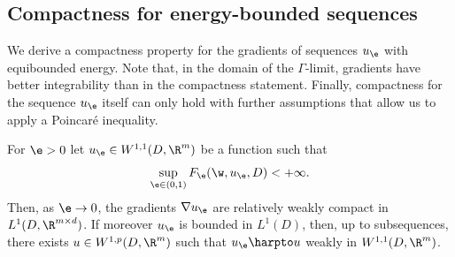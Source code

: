 \subsection{Compactness for energy-bounded sequences}
We derive a compactness property for the gradients of sequences $u_{\e}$ with equibounded energy. Note that, in the domain of the $\Gamma$-limit, gradients have better integrability than in the compactness statement. Finally, compactness for the sequence $u_{\e}$ itself can only hold with further assumptions that allow us to apply a Poincaré inequality.
\begin{lemma}\label{l.compactness}
For $\e>0$ let $u_{\e}\in W^{1,1}(D,\R^m)$ be a function such that
\begin{equation*}
\sup_{\e\in (0,1)}F_{\e}(\w,u_{\e},D)<+\infty.
\end{equation*}
Then, as $\e\to 0$, the gradients $\nabla u_{\e}$ are relatively weakly compact in $L^{1}(D,\R^{m\times d})$. If moreover $u_{\e}$ is bounded in $L^1(D)$, then, up to subsequences, there exists $u\in W^{1,p}(D,\R^m)$ such that $u_{\e}\harpto u$ weakly in $W^{1,1}(D,\R^m)$.
\end{lemma}
